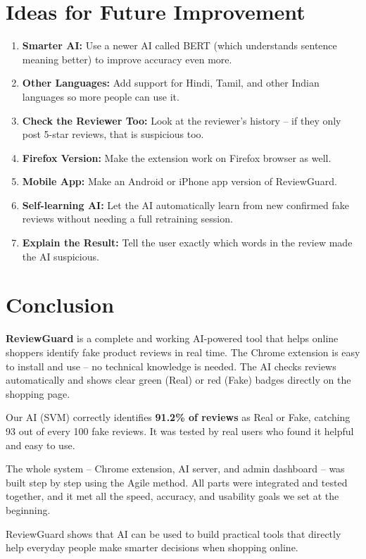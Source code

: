 \documentclass[10pt, a4paper]{report}
\begin{document}
\section{Ideas for Future Improvement}

\begin{enumerate}
  \item \textbf{Smarter AI:} Use a newer AI called BERT (which understands sentence meaning better) to improve accuracy even more.
  \item \textbf{Other Languages:} Add support for Hindi, Tamil, and other Indian languages so more people can use it.
  \item \textbf{Check the Reviewer Too:} Look at the reviewer's history -- if they only post 5-star reviews, that is suspicious too.
  \item \textbf{Firefox Version:} Make the extension work on Firefox browser as well.
  \item \textbf{Mobile App:} Make an Android or iPhone app version of ReviewGuard.
  \item \textbf{Self-learning AI:} Let the AI automatically learn from new confirmed fake reviews without needing a full retraining session.
  \item \textbf{Explain the Result:} Tell the user exactly which words in the review made the AI suspicious.
\end{enumerate}

\section{Conclusion}

\textbf{ReviewGuard} is a complete and working AI-powered tool that helps online shoppers identify fake product reviews in real time. The Chrome extension is easy to install and use -- no technical knowledge is needed. The AI checks reviews automatically and shows clear green (Real) or red (Fake) badges directly on the shopping page.

Our AI (SVM) correctly identifies \textbf{91.2\% of reviews} as Real or Fake, catching 93 out of every 100 fake reviews. It was tested by real users who found it helpful and easy to use.

The whole system -- Chrome extension, AI server, and admin dashboard -- was built step by step using the Agile method. All parts were integrated and tested together, and it met all the speed, accuracy, and usability goals we set at the beginning.

ReviewGuard shows that AI can be used to build practical tools that directly help everyday people make smarter decisions when shopping online.
\end{document}
